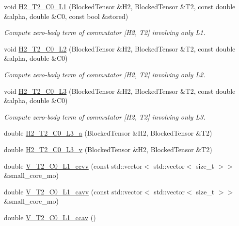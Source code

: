 \begin{DoxyCompactItemize}
void \mbox{\hyperlink{classforte_1_1_d_s_r_g___m_r_p_t_a0a92487f2ed90b7b5503626163b4ab5d}{H2\+\_\+\+T2\+\_\+\+C0\+\_\+\+L1}} (Blocked\+Tensor \&H2, Blocked\+Tensor \&T2, const double \&alpha, double \&C0, const bool \&stored)
\begin{DoxyCompactList}\small\item\em Compute zero-\/body term of commutator \mbox{[}H2, T2\mbox{]} involving only L1. \end{DoxyCompactList}\item 
void \mbox{\hyperlink{classforte_1_1_d_s_r_g___m_r_p_t_aba08dd12fb004053d65e40340a43d68e}{H2\+\_\+\+T2\+\_\+\+C0\+\_\+\+L2}} (Blocked\+Tensor \&H2, Blocked\+Tensor \&T2, const double \&alpha, double \&C0)
\begin{DoxyCompactList}\small\item\em Compute zero-\/body term of commutator \mbox{[}H2, T2\mbox{]} involving only L2. \end{DoxyCompactList}\item 
void \mbox{\hyperlink{classforte_1_1_d_s_r_g___m_r_p_t_afff5d8a261acd90a0486add4d7baff87}{H2\+\_\+\+T2\+\_\+\+C0\+\_\+\+L3}} (Blocked\+Tensor \&H2, Blocked\+Tensor \&T2, const double \&alpha, double \&C0)
\begin{DoxyCompactList}\small\item\em Compute zero-\/body term of commutator \mbox{[}H2, T2\mbox{]} involving only L3. \end{DoxyCompactList}\item 
double \mbox{\hyperlink{classforte_1_1_d_s_r_g___m_r_p_t_aa5d9db7de36918472ea172ee7438988d}{H2\+\_\+\+T2\+\_\+\+C0\+\_\+\+L3\+\_\+a}} (Blocked\+Tensor \&H2, Blocked\+Tensor \&T2)
\item 
double \mbox{\hyperlink{classforte_1_1_d_s_r_g___m_r_p_t_a28b3882eb995c1d18c7bc73262f2cef9}{H2\+\_\+\+T2\+\_\+\+C0\+\_\+\+L3\+\_\+v}} (Blocked\+Tensor \&H2, Blocked\+Tensor \&T2)
\item 
double \mbox{\hyperlink{classforte_1_1_d_s_r_g___m_r_p_t_a09cc4cfc50e1f42659027dd847733c1b}{V\+\_\+\+T2\+\_\+\+C0\+\_\+\+L1\+\_\+ccvv}} (const std\+::vector$<$ std\+::vector$<$ size\+\_\+t $>$$>$ \&small\+\_\+core\+\_\+mo)
\item 
double \mbox{\hyperlink{classforte_1_1_d_s_r_g___m_r_p_t_afb34a99b3a175235b41ad12be9617735}{V\+\_\+\+T2\+\_\+\+C0\+\_\+\+L1\+\_\+cavv}} (const std\+::vector$<$ std\+::vector$<$ size\+\_\+t $>$$>$ \&small\+\_\+core\+\_\+mo)
\item 
double \mbox{\hyperlink{classforte_1_1_d_s_r_g___m_r_p_t_a4def5a7f2c18569e16ed49015db4d804}{V\+\_\+\+T2\+\_\+\+C0\+\_\+\+L1\+\_\+ccav}} ()

\end{DoxyCompactItemize}
